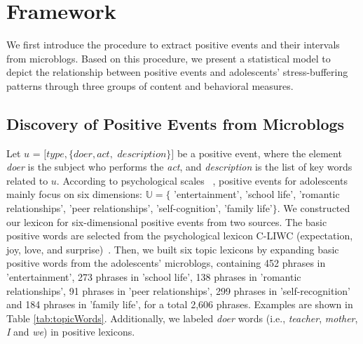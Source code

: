 \section{Framework}
\label{sec:frame}
We first introduce the procedure to extract positive events and their intervals from microblogs.
Based on this procedure,
we present a statistical model to depict the relationship between positive events and adolescents' stress-buffering patterns through three groups of content and behavioral measures.

\subsection{Discovery of Positive Events from Microblogs}
\label{sec:frame1}
Let $u$ = $[type,\{doer, act,$ $description\}]$ be a positive event,
where the element \emph{doer} is the subject who performs the \emph{act},
and \emph{description} is the list of key words related to $u$.
According to psychological scales ~\citep{Jun2008Influence,hassles},
positive events for adolescents mainly focus on six dimensions:
$\mathbb{U} =\{$ 'entertainment', 'school life', 'romantic relationships',
'peer relationships', 'self-cognition', 'family life'$\}$.
We constructed our lexicon for six-dimensional positive events from two sources.
The basic positive words are selected from the psychological lexicon C-LIWC
(expectation, joy, love, and surprise)~\citep{Tausczik2010The}.
Then, we built six topic lexicons by expanding basic positive words from the adolescents' microblogs,
containing 452 phrases in 'entertainment',
273 phrases in 'school life',
138 phrases in 'romantic relationships',
91 phrases in 'peer relationships',
299 phrases in 'self-recognition' and 184 phrases in 'family life', for a total 2,606 phrases.
Examples are shown in Table \ref{tab:topicWords}.
Additionally, we labeled \emph{doer} words (i.e., \emph{teacher}, \emph{mother},
\emph{I} and \emph{we}) in positive lexicons.

